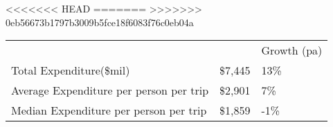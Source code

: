 <<<<<<< HEAD
=======
>>>>>>> 0eb56673b1797b3009b5fce18f6083f76c0eb04a
\begin{tabular}[t]{p{5.4cm}p{0.9cm}p{1.2cm}}
    &   & Growth (pa) \\ 
 Total Expenditure(\$mil) & \$7,445 & 13\% \\ 
  Average Expenditure per person per trip & \$2,901 & 7\% \\ 
  Median Expenditure per person per trip & \$1,859 & -1\% \\ 
  \end{tabular}
